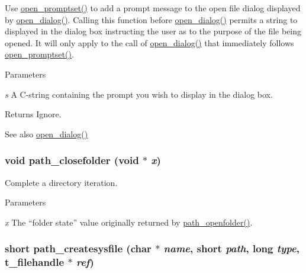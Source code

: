 Use \hyperlink{group__files_gaff6d7264cad52c579b9373870bed50db}{open\_\-promptset()} to add a prompt message to the open file dialog displayed by \hyperlink{group__files_ga0d8fd0b13e2e623298a45e846af3fe1a}{open\_\-dialog()}. Calling this function before \hyperlink{group__files_ga0d8fd0b13e2e623298a45e846af3fe1a}{open\_\-dialog()} permits a string to displayed in the dialog box instructing the user as to the purpose of the file being opened. It will only apply to the call of \hyperlink{group__files_ga0d8fd0b13e2e623298a45e846af3fe1a}{open\_\-dialog()} that immediately follows \hyperlink{group__files_gaff6d7264cad52c579b9373870bed50db}{open\_\-promptset()}.


\begin{DoxyParams}{Parameters}
\item[{\em s}]A C-\/string containing the prompt you wish to display in the dialog box. \end{DoxyParams}
\begin{DoxyReturn}{Returns}
Ignore.
\end{DoxyReturn}
\begin{DoxySeeAlso}{See also}
\hyperlink{group__files_ga0d8fd0b13e2e623298a45e846af3fe1a}{open\_\-dialog()} 
\end{DoxySeeAlso}
\hypertarget{group__files_ga63ca3fd6e4acb9f1b1e56b2d609bf4af}{
\subsubsection[{path\_\-closefolder}]{\setlength{\rightskip}{0pt plus 5cm}void path\_\-closefolder (void $\ast$ {\em x})}}
\label{group__files_ga63ca3fd6e4acb9f1b1e56b2d609bf4af}


Complete a directory iteration. 
\begin{DoxyParams}{Parameters}
\item[{\em x}]The “folder state” value originally returned by \hyperlink{group__files_ga80aa97732be321d9f2e2212485e0367a}{path\_\-openfolder()}. \end{DoxyParams}
\hypertarget{group__files_ga044310e9440119f12c57e9b985a9e1a3}{
\subsubsection[{path\_\-createsysfile}]{\setlength{\rightskip}{0pt plus 5cm}short path\_\-createsysfile (char $\ast$ {\em name}, \/  short {\em path}, \/  long {\em type}, \/  {\bf t\_\-filehandle} $\ast$ {\em ref})}}
\label{group__files_ga044310e9440119f12c57e9b985a9e1a3}


